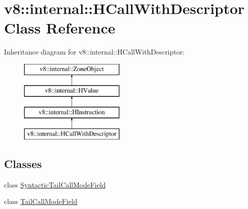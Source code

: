 \hypertarget{classv8_1_1internal_1_1_h_call_with_descriptor}{}\section{v8\+:\+:internal\+:\+:H\+Call\+With\+Descriptor Class Reference}
\label{classv8_1_1internal_1_1_h_call_with_descriptor}
Inheritance diagram for v8\+:\+:internal\+:\+:H\+Call\+With\+Descriptor\+:\begin{figure}[H]
\begin{center}
\leavevmode
\includegraphics[height=4.000000cm]{classv8_1_1internal_1_1_h_call_with_descriptor}
\end{center}
\end{figure}
\subsection*{Classes}
\begin{DoxyCompactItemize}
\item 
class \hyperlink{classv8_1_1internal_1_1_h_call_with_descriptor_1_1_syntactic_tail_call_mode_field}{Syntactic\+Tail\+Call\+Mode\+Field}
\item 
class \hyperlink{classv8_1_1internal_1_1_h_call_with_descriptor_1_1_tail_call_mode_field}{Tail\+Call\+Mode\+Field}
\end{DoxyCompactItemize}
